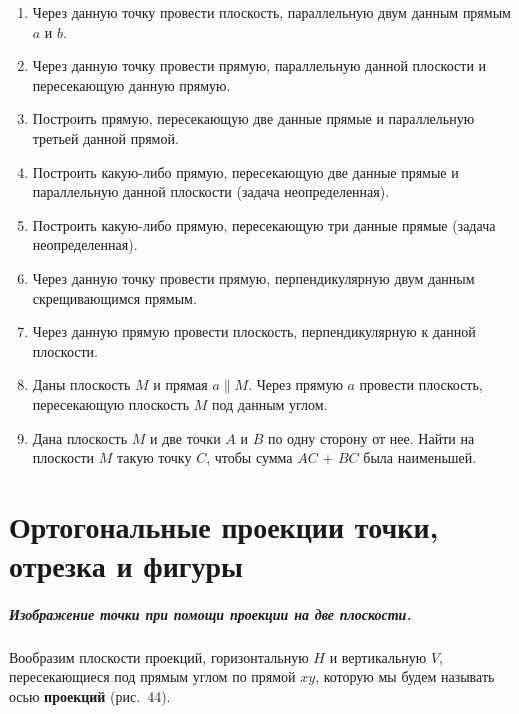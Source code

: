 \documentclass[twoside]{book}
\begin{document}

\begin{enumerate}[resume]
\item
Через данную точку провести плоскость, параллельную двум данным прямым $a$ и $b$.

\item
Через данную точку провести прямую, параллельную данной плоскости и пересекающую данную прямую.

\item
Построить прямую, пересекающую две данные прямые и параллельную третьей данной прямой.

\item
Построить какую-либо прямую, пересекающую две данные прямые и параллельную данной плоскости (задача неопределенная).

\item
Построить какую-либо прямую, пересекающую три данные прямые (задача неопределенная). %

\item
Через данную точку провести прямую, перпендикулярную двум данным скрещивающимся прямым.

\item
Через данную прямую провести плоскость, перпендикулярную к данной плоскости.

\item
Даны плоскость $M$ и прямая $a\parallel M$.
Через прямую $a$ провести плоскость, пересекающую плоскость $M$ под данным углом.

\item
Дана плоскость $M$ и две точки $A$ и $B$ по одну сторону от нее.
Найти на плоскости $M$ такую точку $C$, чтобы сумма $AC$ + $BC$ была наименьшей.

\end{enumerate}

\chapter[Ортогональные проекции]{Ортогональные проекции точки, отрезка и фигуры}

\paragraph{Изображение точки при помощи проекции на две плоскости.}\label{1938/s54}
Вообразим плоскости проекций, горизонтальную $H$ и вертикальную $V$, пересекающиеся под прямым углом по прямой $xy$, которую мы будем называть осью \textbf{проекций} (рис.~44).
\end{document}
